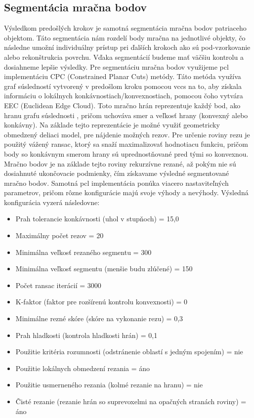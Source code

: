 \subsection{Segmentácia mračna bodov}
\noindent Výsledkom predošlých krokov je samotná segmentácia mračna bodov patriaceho objektom. Táto segmentácia nám rozdelí body mračna na jednotlivé objekty, čo následne umožní individuálny prístup pri ďalších  krokoch ako sú pod-vzorkovanie alebo rekonštrukcia povrchu. Vďaka segmentácií budeme mať väčšiu kontrolu a dosiahneme lepšie výsledky.
\newline\indent Pre segmentáciu mračna bodov využijeme \acrshort{pcl} implementáciu CPC (Constrained Planar Cuts) metódy. Táto metóda využíva graf súsledností vytvorený v predošlom kroku pomocou \acrshort{vccs} na to, aby získala informáciu o lokálnych konkávnostiach/konvexnostiach, pomocou čoho vytvára EEC (Euclidean Edge Cloud). Toto mračno hrán reprezentuje každý bod, ako hranu grafu súslednosti , pričom uchováva smer a veľkosť hrany (konvexný alebo konkávny). Na základe tejto reprezentácie je možné využiť geometricky obmedzený deliaci model, pre nájdenie možných rezov. Pre určenie roviny rezu je použitý vážený \acrshort{ransac}, ktorý sa snaží maximalizovať hodnotiacu funkciu, pričom body so konkávnym smerom hrany sú uprednostňované pred  tými so konvexnou. Mračno bodov je na základe tejto roviny rekurzívne rezané, až pokým nie sú dosiahnuté ukončovacie podmienky, čím získavame výsledné segmentované mračno bodov. \cite{CPCsegmentation}
\newline\indent Samotná \acrshort{pcl} implementácia ponúka viacero nastaviteľných parametrov, pričom rôzne konfigurácie majú svoje výhody a nevýhody. Výsledná konfigurácia vyzerá následovne:

\begin{itemize}
    \setlength\itemsep{0.1em}
    \item Prah tolerancie konkávnosti (uhol v stupňoch) = 15,0
    \item Maximálny počet rezov = 20
    \item Minimálna veľkosť rezaného segmentu = 300
    \item Minimálna veľkosť segmentu (menšie budu zlúčené) = 150
    \item Počet \acrshort{ransac} iterácií = 3000
    \item K-faktor (faktor pre rozšírenú kontrolu konvexnosti) = 0
    \item Minimálne rezné skóre (skóre na vykonanie rezu) = 0,3
    \item Prah hladkosti (kontrola hladkosti hrán) = 0,1
    \item Použitie kritéria rozumnosti (odstránenie oblastí s jedným spojením) = nie
    \item Použitie lokálnych obmedzení rezania = áno
    \item Použitie usmerneného rezania (kolmé rezanie na hranu) = nie
    \item Čisté rezanie (rezanie hrán so suprevoxelmi na opačných stranách roviny) = áno
\end{itemize}

